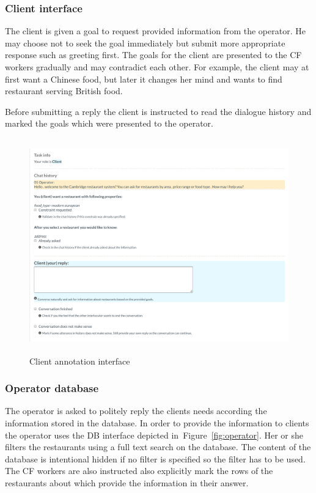 \documentclass[runningheads,a4paper]{llncs}
\begin{document}
\subsubsection{Client interface}
\label{sec:client}

The client is given a goal to request provided information from the operator.
He may choose not to seek the goal immediately but submit more appropriate response such as greeting first.
The goals for the client are presented to the CF workers gradually and may contradict each other.
For example, the client may at first want a Chinese food, but later it changes her mind and wants to find restaurant serving British food.

Before submitting a reply the client is instructed to read the dialogue history and marked the goals which were presented to the operator.

\begin{figure}
\begin{center}
\includegraphics[height=25em]{gui-annotators-client}
\caption{Client annotation interface}
\end{center}
\vspace{-0.80em}
\label{fig:client}
\end{figure}

\subsubsection{Operator database}
\label{sec:operator}
The operator is asked to politely reply the clients needs according the information stored in the database.
In order to provide the information to clients the operator uses the DB interface depicted in~Figure~\ref{fig:operator}.
Her or she filters the restaurants using a full text search on the database.
The content of the database is intentional hidden if no filter is specified so the filter has to be used.
The CF workers are also instructed also explicitly mark the rows of the restaurants about which provide the information in their answer.
\end{document}
